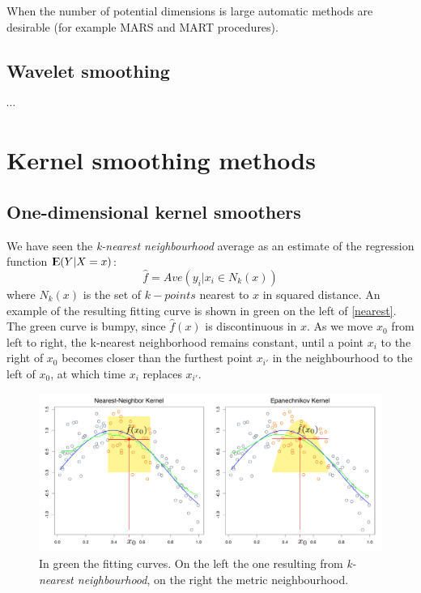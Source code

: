 \documentclass[12pt, letterpaper]{article}
\theoremstyle{definition}
\newcommand{\E}{{\rm I\kern-.3em E}}
\begin{document}
When the number of potential dimensions is large automatic methods are desirable (for example MARS and MART procedures).
\subsection{Wavelet smoothing}
$\cdots$

\newpage
\section{Kernel smoothing methods}
\subsection{One-dimensional kernel smoothers}
We have seen the \textit{k-nearest neighbourhood} average as an estimate of the regression function $\E(Y|X=x)$:
\begin{equation}
\hat{f} = Ave(y_i|x_i\in N_k(x))
\end{equation}
where $N_k(x)$ is the set of $k-points$ nearest to $x$ in squared distance. An example of the resulting fitting curve is shown in green on the left of \autoref{nearest}. The green curve is bumpy, since $\hat{f}(x)$ is discontinuous in $x$. As we move $x_0$ from left to right, the k-nearest neighborhood remains constant, until a point $x_i$ to the right of $x_0$ becomes closer than the furthest point $x_{i'}$ in the neighbourhood to the left of $x_0$, at which time $x_i$ replaces $x_{i'}$. 
\begin{figure}
\centering
\includegraphics[scale=0.38]{img/nearest}
\caption{In green the fitting curves. On the left the one resulting from \textit{k-nearest neighbourhood}, on the right the metric neighbourhood.}
\label{nearest}
\end{figure}
\end{document}
